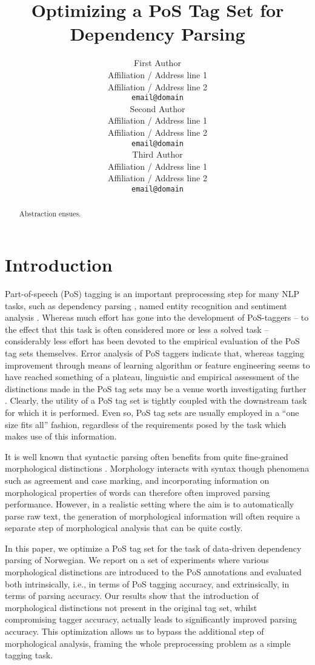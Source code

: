 \documentclass[11pt,a4paper]{article}
\title{Optimizing a PoS Tag Set for Dependency Parsing}
\author{First Author \\
  Affiliation / Address line 1 \\
  Affiliation / Address line 2 \\
  {\tt email@domain} \\\And
  Second Author \\
  Affiliation / Address line 1 \\
  Affiliation / Address line 2 \\
  {\tt email@domain}  \\\And
  Third Author \\
  Affiliation / Address line 1 \\
  Affiliation / Address line 2 \\
  {\tt email@domain} \\}
\date{}
\begin{document}
\maketitle
\begin{abstract}
Abstraction ensues.
\end{abstract}


\section{Introduction}
\label{sec:intro}
Part-of-speech (PoS) tagging is an important preprocessing step for many NLP
tasks, such as dependency parsing \cite{Niv:Hal:Kub:07,Haj:Cia:Joh:09}, named
entity recognition \cite{Tjo:DeM:03} and sentiment analysis
\cite{Wil:Wie:Hof:09}. Whereas much effort has gone into the development of
PoS-taggers -- to the effect that this task is often considered more or less a
solved task -- considerably less effort has been devoted to the empirical
evaluation of the PoS tag sets themselves. Error analysis of PoS taggers
indicate that, whereas tagging improvement through means of learning algorithm
or feature engineering seems to have reached something of a plateau, linguistic
and empirical assessment of the distinctions made in the PoS tag sets may be a
venue worth investigating further \cite{Man:11}. Clearly, the utility of a PoS
tag set is tightly coupled with the downstream task for which it is performed.
Even so, PoS tag sets are usually employed in a ``one size fits all'' fashion,
regardless of the requirements posed by the task which makes use of this
information.

It is well known that syntactic parsing often benefits from quite fine-grained
morphological distinctions \cite{Zha:Niv:11,See:Kuh:13}. Morphology interacts
with syntax though phenomena such as agreement and case marking, and
incorporating information on morphological properties of words can therefore
often improved parsing performance. However, in a realistic setting where the
aim is to automatically parse raw text, the generation of morphological
information will often require a separate step of morphological analysis that
can be quite costly.

In this paper, we optimize a PoS tag set for the task of data-driven dependency
parsing of Norwegian. We report on a set of experiments where various
morphological distinctions are introduced to the PoS annotations and evaluated
both intrinsically, i.e., in terms of PoS tagging accuracy, and extrinsically,
in terms of parsing accuracy. Our results show that the introduction of
morphological distinctions not present in the original tag set, whilst
compromising tagger accuracy, actually leads to significantly improved parsing
accuracy. This optimization allows us to bypass the additional step of
morphological analysis, framing the whole preprocessing problem as a simple
tagging task.
\end{document}
